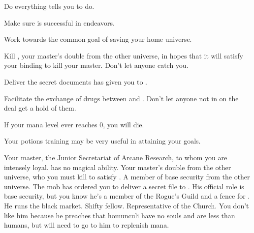 \documentclass[char]{guildcamp3}
\begin{document}
\begin{itemz}[Goals]
	\item Do everything \cNobleOne{} tells you to do.
	\item Make sure \cNobleOne{} is successful in \cNobleOne{\their} endeavors.
	\item Work towards the common goal of saving your home universe.
	\item Kill \cPoliOne{}, your master's double from the other universe, in hopes that it will satisfy your binding to kill your master. Don't let anyone catch you.
	\item Deliver the secret documents \bMagicMob{} has given you to \cSpecOpTwo{}.
	\item Facilitate the exchange of drugs between \bMagicMob{} and \bTechMob{}. Don't let anyone not in on the deal get a hold of them.
\end{itemz}

\begin{itemz}[Notes]
	\item If your mana level ever reaches 0, you will die.
	\item Your potions training may be very useful in attaining your goals.
\end{itemz}


\begin{contacts}
	\contact{\cNobleOne{}} Your master, the Junior Secretariat of Arcane Research, to whom you are intensely loyal.  has no magical ability.
	\contact{\cPoliOne{}} Your master's double from the other universe, who you must kill to satisfy \bMagicMob{}.
	\contact{\cSpecOpTwo{}} A member of base security from the other universe. The mob has ordered you to deliver a secret file to \cSpecOpTwo{\them}. 
	\contact{\cRogueTwo{}} His official role is base security, but you know he's a member of the Rogue's Guild and a fence for \bMagicMob{}. He runs the black market. Shifty fellow.
	\contact{\cPaladin{}} Representative of the Church. You don't like him because he preaches that homunculi have no souls and are less than humans, but will need to go to him to replenish mana.
\end{contacts}
\end{document}
